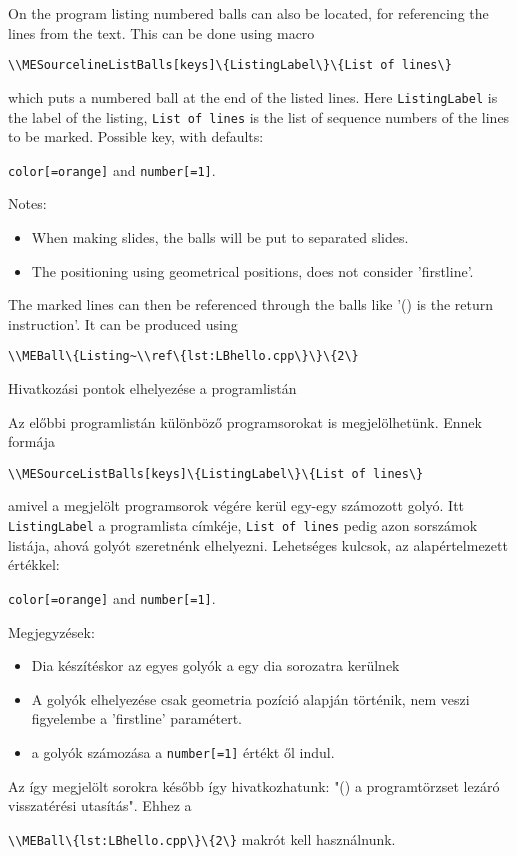 {
On the program listing numbered balls can also be located, for referencing the 
lines from the text. This can be done using macro
\par\noindent\lstinline|\\MESourcelineListBalls[keys]\{ListingLabel\}\{List of lines\}|
\par\noindent which puts a numbered ball at the end of the listed lines.
Here \lstinline|ListingLabel| is the label of the listing, \lstinline|List of lines|
is the list of sequence numbers of the lines to be marked.
Possible key, with defaults:
\par\noindent\lstinline|color[=orange]| and \lstinline|number[=1]|. 


Notes:
\begin{itemize}
\item When making slides, the balls will be put to separated slides.
\item The positioning using geometrical positions, does not consider 'firstline'.
\end{itemize}

The marked lines can then be referenced through the balls like '()
is the return instruction'. It can be produced using 
\par\noindent\lstinline|\\MEBall\{Listing~\\ref\{lst:LBhello.cpp\}\}\{2\}|
}
{Hivatkozási pontok elhelyezése a programlistán}
{
Az előbbi programlistán különböző programsorokat is megjelölhetünk.
Ennek formája 
\par\noindent\lstinline|\\MESourceListBalls[keys]\{ListingLabel\}\{List of lines\}|
\par\noindent amivel a megjelölt programsorok végére kerül egy-egy számozott golyó.
Itt \lstinline|ListingLabel| a programlista címkéje, \lstinline|List of lines|
pedig azon sorszámok listája, ahová golyót szeretnénk elhelyezni.
Lehetséges kulcsok, az alapértelmezett értékkel:
\par\noindent\lstinline|color[=orange]| and \lstinline|number[=1]|. 


Megjegyzések:
\begin{itemize}
\item Dia készítéskor az egyes golyók a egy dia sorozatra kerülnek
\item A golyók elhelyezése csak geometria pozíció alapján történik, nem veszi figyelembe
a 'firstline' paramétert.
\item a golyók számozása a \lstinline|number[=1]| értékt ől indul.
\end{itemize}


Az így megjelölt sorokra később így hivatkozhatunk: "()
a programtörzset lezáró visszatérési utasítás".
Ehhez a 
\par\noindent\lstinline|\\MEBall\{lst:LBhello.cpp\}\{2\}| makrót kell használnunk.

}

